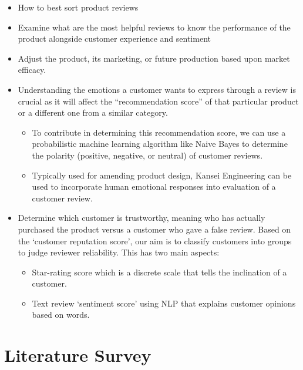 \documentclass[
  letterpaper,
  DIV=11,
  numbers=noendperiod]{scrreprt}
\begin{document}
\begin{itemize}
\item
  How to best sort product reviews
\item
  Examine what are the most helpful reviews to know the performance of
  the product alongside customer experience and sentiment
\item
  Adjust the product, its marketing, or future production based upon
  market efficacy.
\item
  Understanding the emotions a customer wants to express through a
  review is crucial as it will affect the ``recommendation score'' of
  that particular product or a different one from a similar category.

  \begin{itemize}
  \item
    To contribute in determining this recommendation score, we can use a
    probabilistic machine learning algorithm like Naive Bayes to
    determine the polarity (positive, negative, or neutral) of customer
    reviews.
  \item
    Typically used for amending product design, Kansei Engineering can
    be used to incorporate human emotional responses into evaluation of
    a customer review.
  \end{itemize}
\item
  Determine which customer is trustworthy, meaning who has actually
  purchased the product versus a customer who gave a false review. Based
  on the `customer reputation score', our aim is to classify customers
  into groups to judge reviewer reliability. This has two main aspects:

  \begin{itemize}
  \item
    Star-rating score which is a discrete scale that tells the
    inclination of a customer.
  \item
    Text review `sentiment score' using NLP that explains customer
    opinions based on words.
  \end{itemize}
\end{itemize}

\section{Literature Survey}\label{literature-survey}
\end{document}
